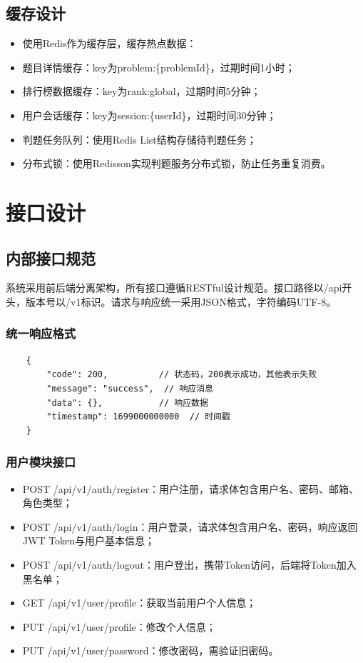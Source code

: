 \documentclass{../template/softeng}
\begin{document}
\subsection{缓存设计}
\begin{itemize}
	\item 使用Redis作为缓存层，缓存热点数据：
	\item 题目详情缓存：key为problem:\{problemId\}，过期时间1小时；
	\item 排行榜数据缓存：key为rank:global，过期时间5分钟；
	\item 用户会话缓存：key为session:\{userId\}，过期时间30分钟；
	\item 判题任务队列：使用Redis List结构存储待判题任务；
	\item 分布式锁：使用Redisson实现判题服务分布式锁，防止任务重复消费。
\end{itemize}

\section{接口设计}

\subsection{内部接口规范}
系统采用前后端分离架构，所有接口遵循RESTful设计规范。接口路径以/api开头，版本号以/v1标识。请求与响应统一采用JSON格式，字符编码UTF-8。

\subsubsection{统一响应格式}
\begin{verbatim}
	{
		"code": 200,          // 状态码，200表示成功，其他表示失败
		"message": "success",  // 响应消息
		"data": {},           // 响应数据
		"timestamp": 1699000000000  // 时间戳
	}
\end{verbatim}

\subsubsection{用户模块接口}
\begin{itemize}
	\item POST /api/v1/auth/register：用户注册，请求体包含用户名、密码、邮箱、角色类型；
	\item POST /api/v1/auth/login：用户登录，请求体包含用户名、密码，响应返回JWT Token与用户基本信息；
	\item POST /api/v1/auth/logout：用户登出，携带Token访问，后端将Token加入黑名单；
	\item GET /api/v1/user/profile：获取当前用户个人信息；
	\item PUT /api/v1/user/profile：修改个人信息；
	\item PUT /api/v1/user/password：修改密码，需验证旧密码。
\end{itemize}
\end{document}
